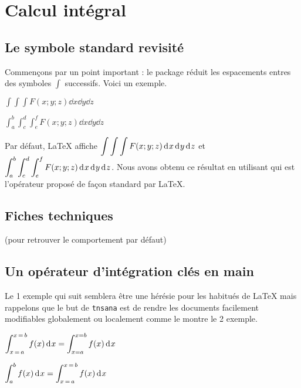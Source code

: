 \documentclass[12pt,a4paper]{article}
\begin{document}
\section{Calcul intégral}

\subsection{Le symbole standard revisité}

Commençons par un point important : le package réduit les espacements entres des symboles $\int$ successifs. Voici un exemple.

\begin{latexex}
$\displaystyle
 \int \int \int 
 F(x;y;z) \dd{x} \dd{y} \dd{z}$

$\displaystyle
 \int_{a}^{b} \int_{c}^{d} \int_{e}^{f} 
 F(x;y;z) \dd{x} \dd{y} \dd{z}$
\end{latexex}


\begin{remark}
	Par défaut, \LaTeX{} affiche
	$\displaystyle
	 \stdint \stdint \stdint
	 F(x;y;z) \dd{x} \dd{y} \dd{z}$
    et
    $\displaystyle
	 \stdint_{a}^{b} \stdint_{c}^{d} \stdint_{e}^{f}
     F(x;y;z) \dd{x} \dd{y} \dd{z}$.
    Nous avons obtenu ce résultat en utilisant  qui est l'opérateur proposé de façon standard par \LaTeX.
\end{remark}




\subsection{Fiches techniques}

 (pour retrouver le comportement par défaut)




\subsection{Un opérateur d'intégration clés en main}


Le 1\ier{} exemple qui suit semblera être une hérésie pour les habitués de \LaTeX{} mais rappelons que le but de \verb+tnsana+ est de rendre les documents facilement modifiables globalement ou localement comme le montre le 2\ieme{} exemple.

\begin{latexex}
 $\displaystyle
  \integrate{f(x)}{x}{a}{b}
= \int_{x=a}^{x=b} f(x) \dd{x}$

 $\displaystyle
  \integrate*{f(x)}{x}{a}{b}
= \integrate{f(x)}{x}{a}{b}$
\end{latexex}
\end{document}
